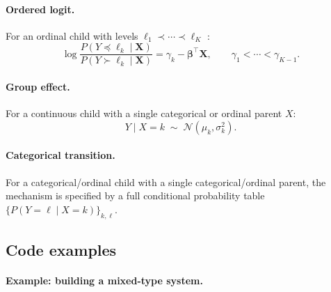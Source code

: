 \documentclass[article]{jss}
\begin{document}
\paragraph{Ordered logit.}
For an ordinal child with levels $\ell_1\prec\cdots\prec\ell_K$
\citep{mccullagh1980regression}:
\begin{equation}
  \log\frac{P(Y\preceq\ell_k\mid\mathbf{X})}{P(Y\succ\ell_k\mid\mathbf{X})}
  = \gamma_k - \boldsymbol\beta^\top\mathbf{X}, \qquad
  \gamma_1 < \cdots < \gamma_{K-1}.
  \label{eq:ordered_logit}
\end{equation}

\paragraph{Group effect.}
For a continuous child with a single categorical or ordinal parent $X$:
\begin{equation}
  Y \mid X = k \;\sim\; \mathcal{N}(\mu_k, \sigma_k^2).
  \label{eq:group_effect}
\end{equation}

\paragraph{Categorical transition.}
For a categorical/ordinal child with a single categorical/ordinal parent, the
mechanism is specified by a full conditional probability table
$\{P(Y = \ell \mid X = k)\}_{k,\ell}$.

\subsection{Code examples}
\label{sec:mech_code}

\paragraph{Example: building a mixed-type system.}
\end{document}
